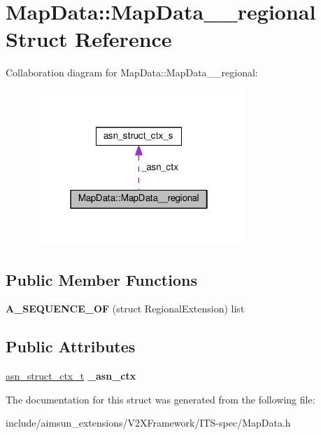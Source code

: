 \hypertarget{structMapData_1_1MapData____regional}{}\section{Map\+Data\+:\+:Map\+Data\+\_\+\+\_\+regional Struct Reference}
\label{structMapData_1_1MapData____regional}


Collaboration diagram for Map\+Data\+:\+:Map\+Data\+\_\+\+\_\+regional\+:\nopagebreak
\begin{figure}[H]
\begin{center}
\leavevmode
\includegraphics[width=226pt]{structMapData_1_1MapData____regional__coll__graph}
\end{center}
\end{figure}
\subsection*{Public Member Functions}
\begin{DoxyCompactItemize}
\item 
{\bfseries A\+\_\+\+S\+E\+Q\+U\+E\+N\+C\+E\+\_\+\+OF} (struct Regional\+Extension) list\hypertarget{structMapData_1_1MapData____regional_adaba10f66c7cfd15819a8259cb53147c}{}\label{structMapData_1_1MapData____regional_adaba10f66c7cfd15819a8259cb53147c}

\end{DoxyCompactItemize}
\subsection*{Public Attributes}
\begin{DoxyCompactItemize}
\item 
\hyperlink{structasn__struct__ctx__s}{asn\+\_\+struct\+\_\+ctx\+\_\+t} {\bfseries \+\_\+asn\+\_\+ctx}\hypertarget{structMapData_1_1MapData____regional_a6721405b22a03a4f22b81c7052d0ba0d}{}\label{structMapData_1_1MapData____regional_a6721405b22a03a4f22b81c7052d0ba0d}

\end{DoxyCompactItemize}


The documentation for this struct was generated from the following file\+:\begin{DoxyCompactItemize}
\item 
include/aimsun\+\_\+extensions/\+V2\+X\+Framework/\+I\+T\+S-\/spec/Map\+Data.\+h\end{DoxyCompactItemize}
